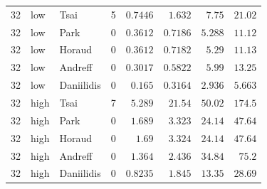 \begin{longtable}{rllrrrrr}
32 & low & Tsai & 5 & $0.7446$ & $1.632$ & $7.75$ & $21.02$ \\
32 & low & Park & 0 & $0.3612$ & $0.7186$ & $5.288$ & $11.12$ \\
32 & low & Horaud & 0 & $0.3612$ & $0.7182$ & $5.29$ & $11.13$ \\
32 & low & Andreff & 0 & $0.3017$ & $0.5822$ & $5.99$ & $13.25$ \\
32 & low & Daniilidis & 0 & $0.165$ & $0.3164$ & $2.936$ & $5.663$ \\
32 & high & Tsai & 7 & $5.289$ & $21.54$ & $50.02$ & $174.5$ \\
32 & high & Park & 0 & $1.689$ & $3.323$ & $24.14$ & $47.64$ \\
32 & high & Horaud & 0 & $1.69$ & $3.324$ & $24.14$ & $47.64$ \\
32 & high & Andreff & 0 & $1.364$ & $2.436$ & $34.84$ & $75.2$ \\
32 & high & Daniilidis & 0 & $0.8235$ & $1.845$ & $13.35$ & $28.69$ \\
\end{longtable}
\endgroup
